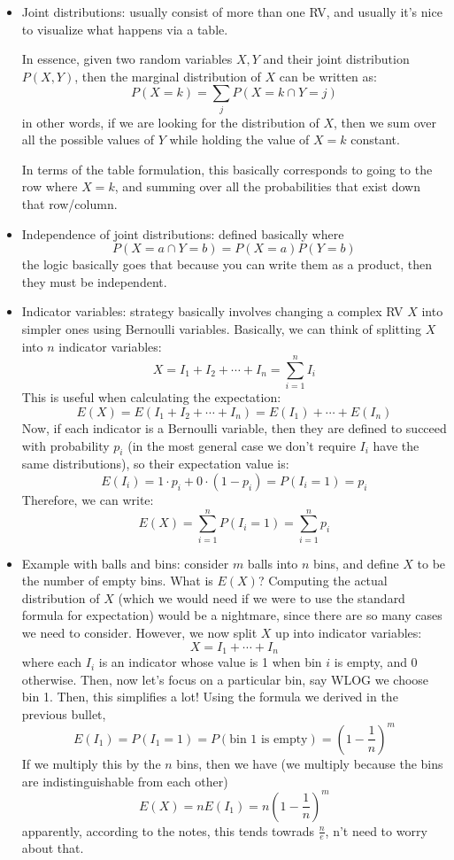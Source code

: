 \documentclass[10pt]{article}
\begin{document}
\begin{itemize}
	\item Joint distributions: usually consist of more than one RV, and usually 
		it's nice to visualize what happens via a table. 

		In essence, given two random variables \( X, Y \) and their 
		joint distribution \( P(X, Y) \), then the marginal distribution of 
		\( X \) can be written as:
		\[
		P(X = k) = \sum_j P(X = k \cap Y = j)
		\] 
		in other words, if we are looking for the distribution of 
		\( X \), then we sum over all the possible values of \( Y \) while 
		holding the value of \( X = k \) constant.  

		In terms of the table formulation, this basically corresponds to 
		going to the row where \( X = k \), and summing over all the probabilities 
		that exist down that row/column. 
	\item Independence of joint distributions: defined basically where 
		\[
		P(X = a \cap Y = b) = P(X = a) P(Y = b)
		\] 
		the logic basically goes that because you can write them as a product, then 
		they must be independent. 
	\item Indicator variables: strategy basically involves changing a complex 
		RV \( X \) into simpler ones using Bernoulli variables. Basically, 
		we can think of splitting  \( X \) into \( n \) indicator variables:
		\[
			X = I_1 + I_2 + \cdots + I_n = \sum_{i = 1}^{n} I_i
		\] 
		This is useful when calculating the expectation:
		\[
		E(X) = E(I_1 + I_2 + \cdots + I_n) = E(I_1) + \cdots + E(I_n) 
		\] 
		Now, if each indicator is a Bernoulli variable, then they are defined 
		to succeed with probability \( p_i \) (in the most 
		general case we don't require \( I_i \) have the same distributions), 
		so their expectation value 
		is:
		\[
			E(I_i) = 1 \cdot p_i + 0 \cdot (1 - p_i) = 
			P(I_i = 1) = p_i 
		\] 
		Therefore, we can write:
		\[
		E(X) = \sum_{i=1}^{n} P(I_i = 1) = \sum_{i=1}^{n} p_i
		\] 
	\item Example with balls and bins: consider \( m \) balls into 
		\( n \) bins, and define \( X \) to be the number of empty bins. What is 
		\( E(X) \)? Computing 
		the actual distribution of \( X \) (which we would need if we were to use 
		the standard formula for expectation) would be a nightmare, since there are
		so many cases we need to consider. However, we now split \( X \) up into 
		indicator variables:
		\[
		X = I_1 + \cdots + I_n
		\]
		where each \( I_i \) is an indicator whose value is 1 when bin \( i \) is 
		empty, and 0 otherwise. Then, now let's focus on a particular bin, 
		say WLOG we choose bin 1. Then, this simplifies a lot! Using the formula 
		we derived in the previous bullet, 
		\[
		E(I_1) = P(I_1 = 1) = P(\text{bin 1 is empty}) = 
		\left( 1 - \frac{1}{n} \right)^{m}
		\] 
		If we multiply this by the \( n \) bins, then we have (we multiply 
		because the bins are indistinguishable from each other) 
		\[
		E(X) = n E(I_1) = n\left( 1 - \frac{1}{n} \right) ^{m}
		\] 
		apparently, according to the notes, this tends towrads \( \frac{n}{e} \), 
n't need to worry about that. 
\end{itemize}
\end{document}
